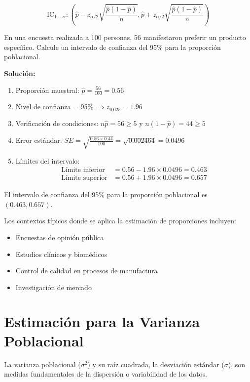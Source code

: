 \[
\text{IC}_{1-\alpha}: \left( \hat{p} - z_{\alpha/2} \sqrt{\frac{\hat{p}(1-\hat{p})}{n}}, \hat{p} + z_{\alpha/2} \sqrt{\frac{\hat{p}(1-\hat{p})}{n}} \right)
\]

\begin{example}
En una encuesta realizada a 100 personas, 56 manifestaron preferir un producto específico. Calcule un intervalo de confianza del 95\% para la proporción poblacional.

\textbf{Solución:}
\begin{enumerate}
\item Proporción muestral: $\hat{p} = \frac{56}{100} = 0.56$
\item Nivel de confianza = 95\% $\Rightarrow z_{0.025} = 1.96$
\item Verificación de condiciones: $n\hat{p} = 56 \geq 5$ y $n(1-\hat{p}) = 44 \geq 5$ 
\item Error estándar: $SE = \sqrt{\frac{0.56 \times 0.44}{100}} = \sqrt{0.002464} = 0.0496$
\item Límites del intervalo:
   \begin{align}
   \text{Límite inferior} &= 0.56 - 1.96 \times 0.0496 = 0.463\\
   \text{Límite superior} &= 0.56 + 1.96 \times 0.0496 = 0.657
   \end{align}
\end{enumerate}

El intervalo de confianza del 95\% para la proporción poblacional es $(0.463, 0.657)$.
\end{example}

\begin{remark}
Los contextos típicos donde se aplica la estimación de proporciones incluyen:
\begin{itemize}
\item Encuestas de opinión pública
\item Estudios clínicos y biomédicos
\item Control de calidad en procesos de manufactura
\item Investigación de mercado
\end{itemize}
\end{remark}

\section{Estimación para la Varianza Poblacional}

La varianza poblacional ($\sigma^2$) y su raíz cuadrada, la desviación estándar ($\sigma$), son medidas fundamentales de la dispersión o variabilidad de los datos.

